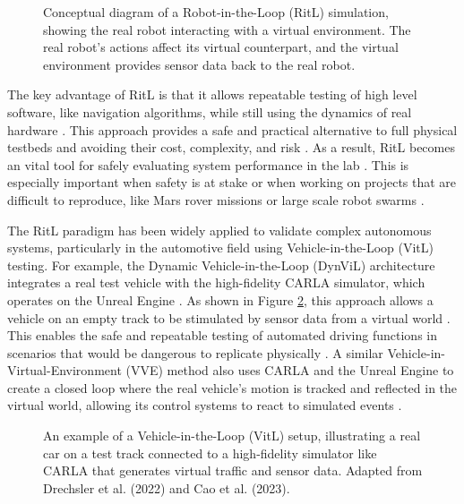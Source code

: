 \begin{figure}[h]
\centering
\caption{Conceptual diagram of a Robot-in-the-Loop (RitL) simulation, showing the real robot interacting with a virtual environment. The real robot's actions affect its virtual counterpart, and the virtual environment provides sensor data back to the real robot.}
\label{fig:ritl_concept}
\end{figure}

The key advantage of RitL is that it allows repeatable testing of high level software, like navigation algorithms, while still using the dynamics of real hardware \cite{Mihalic2022}. This approach provides a safe and practical alternative to full physical testbeds and avoiding their cost, complexity, and risk \cite{Mihalic2022}. As a result, RitL becomes an vital tool for safely evaluating system performance in the lab \cite{Hu05, Mihalic2022}. This is especially important when safety is at stake or when working on projects that are difficult to reproduce, like Mars rover missions or large scale robot swarms \cite{Hu05, Mihalic2022}.

The RitL paradigm has been widely applied to validate complex autonomous systems, particularly in the automotive field using Vehicle-in-the-Loop (VitL) testing. For example, the Dynamic Vehicle-in-the-Loop (DynViL) architecture integrates a real test vehicle with the high-fidelity CARLA simulator, which operates on the Unreal Engine \cite{DSR22}. As shown in Figure \ref{fig:vitl_setup}, this approach allows a vehicle on an empty track to be stimulated by sensor data from a virtual world \cite{DSR22}. This enables the safe and repeatable testing of automated driving functions in scenarios that would be dangerous to replicate physically \cite{DSR22}. A similar Vehicle-in-Virtual-Environment (VVE) method also uses CARLA and the Unreal Engine to create a closed loop where the real vehicle's motion is tracked and reflected in the virtual world, allowing its control systems to react to simulated events \cite{Cao2023}.

\begin{figure}[h]
\centering
\caption{An example of a Vehicle-in-the-Loop (VitL) setup, illustrating a real car on a test track connected to a high-fidelity simulator like CARLA that generates virtual traffic and sensor data. Adapted from Drechsler et al. (2022) and Cao et al. (2023).}
\label{fig:vitl_setup}
\end{figure}

